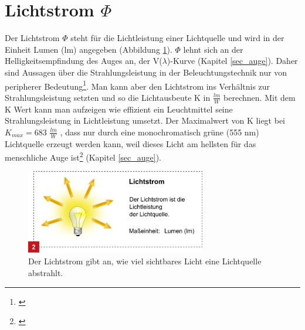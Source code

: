 \section{Lichtstrom $\Phi$} \label{sec_lumen}
Der Lichtstrom $\Phi$ steht für die Lichtleistung einer Lichtquelle und wird in der Einheit Lumen (lm) angegeben (Abbildung \ref{b_lumen}). $\Phi$ lehnt sich an der Helligkeitsempfindung des Auges an, der V($\lambda$)-Kurve (Kapitel \ref{sec_auge}). Daher sind Aussagen über die Strahlungsleistung in der Beleuchtungstechnik nur von peripherer Bedeutung\footnote{\cite[23]{ris}}. Man kann aber den Lichtstrom ins Verhältnis zur Strahlungsleistung setzten und so die Lichtausbeute K in $\frac{lm}{W}$ berechnen. Mit dem K Wert kann man aufzeigen wie effizient ein Leuchtmittel seine Strahlungsleistung in Lichtleistung umsetzt. Der Maximalwert von K liegt bei $K_{max}=683$ $\frac{lm}{W}$ , dass nur durch eine monochromatisch grüne (555 nm) Lichtquelle erzeugt werden kann, weil dieses Licht am hellsten für das menschliche Auge ist\footnote{\cite[24]{ris}} (Kapitel \ref{sec_auge}).

\begin{figure}[H]     %
\centering
\includegraphics[width=0.7\textwidth]{bilder/lumen} 
\caption {Der Lichtstrom gibt an, wie viel sichtbares Licht eine Lichtquelle abstrahlt. \protect\footnotemark}\label{b_lumen}
\end{figure}


